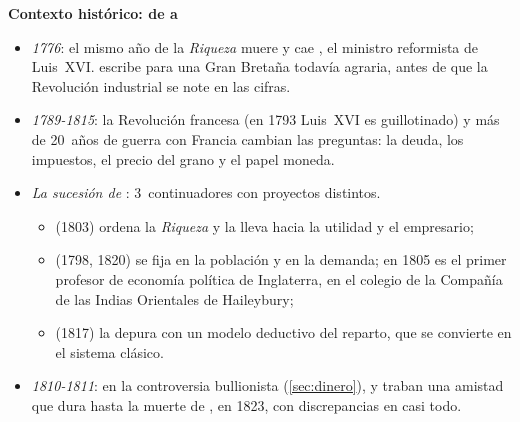 \documentclass[11pt]{article}
\begin{document}
\begin{infografia}[H]
\centering
\caption{La economía clásica,  y : cronología e influencias}\label{figu:clasicos-tiempo}
\end{infografia}

\begin{anotaciones}
\textbf{Contexto histórico: de  a }\nocite{HET2026Ricardian}
\begin{itemize}
\item \emph{1776}: el mismo año de la \emph{Riqueza} muere  y cae , el ministro reformista de Luis~XVI\nocite{HET2026Turgot}.  escribe para una Gran Bretaña todavía agraria, antes de que la Revolución industrial se note en las cifras.
\item \emph{1789-1815}: la Revolución francesa (en 1793 Luis~XVI es guillotinado) y más de 20~años de guerra con Francia cambian las preguntas: la deuda, los impuestos, el precio del grano y el papel moneda.
\item \emph{La sucesión de }: 3~continuadores con proyectos distintos.
  \begin{itemize}
  \item {} (1803) ordena la \emph{Riqueza} y la lleva hacia la utilidad y el empresario;
  \item {} (1798, 1820) se fija en la población y en la demanda; en 1805 es el primer profesor de economía política de Inglaterra, en el colegio de la Compañía de las Indias Orientales de Haileybury\nocite{HET2026Malthus};
  \item {} (1817) la depura con un modelo deductivo del reparto, que se convierte en el sistema clásico.
  \end{itemize}
\item \emph{1810-1811}: en la controversia bullionista (\ref{sec:dinero}),  y  traban una amistad que dura hasta la muerte de , en 1823, con discrepancias en casi todo\nocite{Dorfman1989Malthus}.
\end{itemize}
\end{anotaciones}
\end{document}
